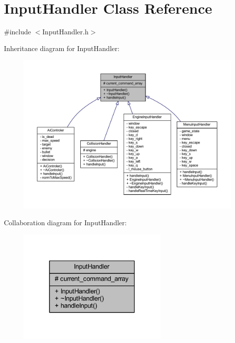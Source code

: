 \hypertarget{class_input_handler}{}\section{Input\+Handler Class Reference}
\label{class_input_handler}


{\ttfamily \#include $<$Input\+Handler.\+h$>$}



Inheritance diagram for Input\+Handler\+:\nopagebreak
\begin{figure}[H]
\begin{center}
\leavevmode
\includegraphics[width=350pt]{class_input_handler__inherit__graph}
\end{center}
\end{figure}


Collaboration diagram for Input\+Handler\+:\nopagebreak
\begin{figure}[H]
\begin{center}
\leavevmode
\includegraphics[width=210pt]{class_input_handler__coll__graph}
\end{center}
\end{figure}
